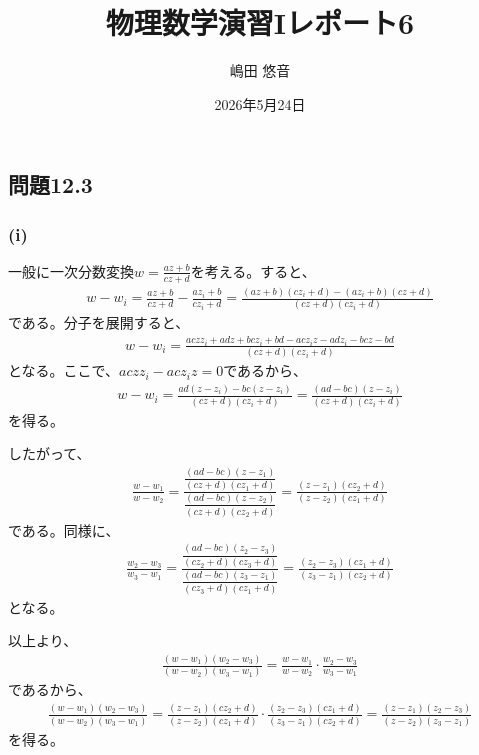 \documentclass[platex,dvipdfmx,a4paper]{jsarticle}
\title{物理数学演習Iレポート6}
\author{嶋田 悠音}
\date{2026年5月24日}
\begin{document}
  \maketitle

  \subsection*{問題12.3}

  \subsubsection*{(i)}

  一般に一次分数変換$w=\frac{az+b}{cz+d}$を考える。すると、
  \begin{align*}
    w-w_i=\frac{az+b}{cz+d}-\frac{az_i+b}{cz_i+d}=\frac{(az+b)(cz_i+d)-(az_i+b)(cz+d)}{(cz+d)(cz_i+d)}
  \end{align*}
  である。分子を展開すると、
  \begin{align*}
    w-w_i=\frac{acz z_i+adz+bcz_i+bd-acz_i z-adz_i-bcz-bd}{(cz+d)(cz_i+d)}
  \end{align*}
  となる。ここで、$acz z_i-acz_i z=0$であるから、
  \begin{align*}
    w-w_i=\frac{ad(z-z_i)-bc(z-z_i)}{(cz+d)(cz_i+d)}=\frac{(ad-bc)(z-z_i)}{(cz+d)(cz_i+d)}
  \end{align*}
  を得る。

  したがって、
  \begin{align*}
    \frac{w-w_1}{w-w_2}=\frac{\dfrac{(ad-bc)(z-z_1)}{(cz+d)(cz_1+d)}}{\dfrac{(ad-bc)(z-z_2)}{(cz+d)(cz_2+d)}}=\frac{(z-z_1)(cz_2+d)}{(z-z_2)(cz_1+d)}
  \end{align*}
  である。同様に、
  \begin{align*}
    \frac{w_2-w_3}{w_3-w_1}=\frac{\dfrac{(ad-bc)(z_2-z_3)}{(cz_2+d)(cz_3+d)}}{\dfrac{(ad-bc)(z_3-z_1)}{(cz_3+d)(cz_1+d)}}=\frac{(z_2-z_3)(cz_1+d)}{(z_3-z_1)(cz_2+d)}
  \end{align*}
  となる。

  以上より、
  \begin{align*}
    \frac{(w-w_1)(w_2-w_3)}{(w-w_2)(w_3-w_1)}=\frac{w-w_1}{w-w_2}\cdot\frac{w_2-w_3}{w_3-w_1}
  \end{align*}
  であるから、
  \begin{align*}
    \frac{(w-w_1)(w_2-w_3)}{(w-w_2)(w_3-w_1)}=\frac{(z-z_1)(cz_2+d)}{(z-z_2)(cz_1+d)}\cdot\frac{(z_2-z_3)(cz_1+d)}{(z_3-z_1)(cz_2+d)}=\frac{(z-z_1)(z_2-z_3)}{(z-z_2)(z_3-z_1)}
  \end{align*}
  を得る。
\end{document}
